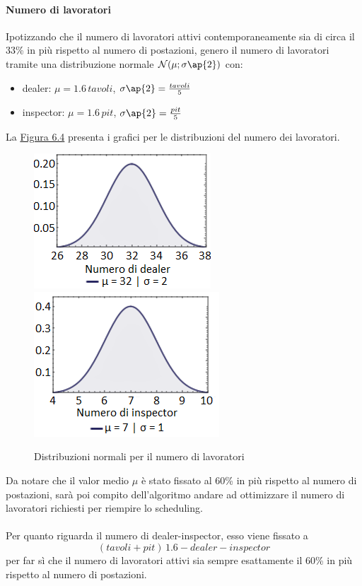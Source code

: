     \paragraph{Numero di lavoratori} Ipotizzando che il numero di lavoratori attivi contemporaneamente sia di circa il 33\% in più rispetto al numero di postazioni, genero il numero di lavoratori tramite una distribuzione normale $\mathcal{N}(\mu;\sigma \ap{2})$ con:
    \begin{itemize}
        \item dealer: $\mu = 1.6 \, tavoli$, $\sigma \ap{2} = \frac{tavoli}{5}$
        \item inspector: $\mu = 1.6 \, pit$, $\sigma \ap{2} = \frac{pit}{5}$
    \end{itemize}
\noindent
La \hyperref[fig64]{Figura 6.4} presenta i grafici per le distribuzioni del numero dei lavoratori.
    \begin{figure}[!htb]
        \label{fig64}
        \begin{widepage}
        \centering
        \includegraphics[width=.49\textwidth]{../immagini/gauss_dealer_w.png}\hfil
        \includegraphics[width=.49\textwidth]{../immagini/gauss_inspector_w.png}
        \caption{Distribuzioni normali per il numero di lavoratori}
        \end{widepage}
    \end{figure}
    \FloatBarrier
    \noindent
    Da notare che il valor medio $\mu$ è stato fissato al 60\% in più rispetto al numero di postazioni, sarà poi compito dell'algoritmo andare ad ottimizzare il numero di lavoratori richiesti per riempire lo scheduling. \\
    \\
    Per quanto riguarda il numero di dealer-inspector, esso viene fissato a \[(tavoli + pit) \, 1.6 - dealer - inspector\] per far sì che il numero di lavoratori attivi sia sempre esattamente il 60\% in più rispetto al numero di postazioni.
    \clearpage
